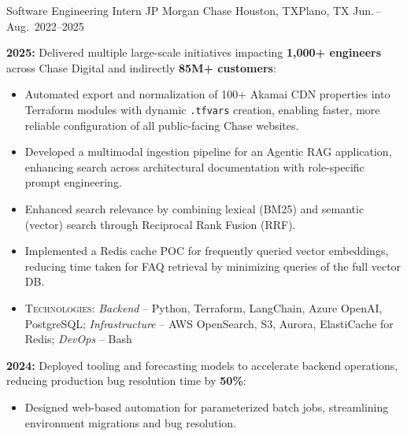 

\begin{cventries}
\cventry
    {Software Engineering Intern} %
    {JP Morgan Chase} %
    {Houston, TX\newline Plano, TX} %
    {Jun.\,--\,Aug.\ 2022--2025} %
    {
        \begin{cvitems}
          \item {\textbf{2025:} Delivered multiple large-scale initiatives impacting \textbf{1,000+ engineers} across Chase Digital and indirectly \textbf{85M+ customers}:
          \begin{itemize}
            \item Automated export and normalization of 100+ Akamai CDN properties into Terraform modules with dynamic \texttt{.tfvars} creation, enabling faster, more reliable configuration of all public-facing Chase websites.
            \item Developed a multimodal ingestion pipeline for an Agentic RAG application, enhancing search across architectural documentation with role-specific prompt engineering.
            \item Enhanced search relevance by combining lexical (BM25) and semantic (vector) search through Reciprocal Rank Fusion (RRF).
            \item Implemented a Redis cache POC for frequently queried vector embeddings, reducing time taken for FAQ retrieval by minimizing queries of the full vector DB.
            \item \textsc{Technologies}: \textit{Backend} – Python, Terraform, LangChain, Azure OpenAI, PostgreSQL; \textit{Infrastructure} – AWS OpenSearch, S3, Aurora, ElastiCache for Redis; \textit{DevOps} – Bash
          \end{itemize}
          }
          \item { \textbf{2024:} Deployed tooling and forecasting models to accelerate backend operations, reducing production bug resolution time by \textbf{50\%}:
          \begin{itemize}
            \item Designed web-based automation for parameterized batch jobs, streamlining environment migrations and bug resolution.

\end{itemize}}
\end{cvitems}}
\end{cventries}
